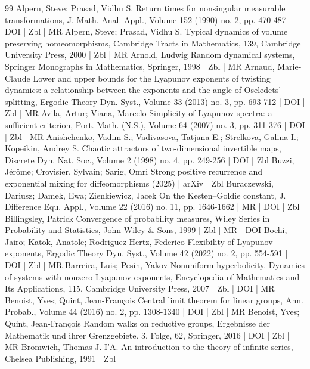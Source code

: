 \begin{thebibliography}{99}
 Alpern, Steve; Prasad, Vidhu S. Return times for nonsingular measurable transformations, J. Math. Anal. Appl., Volume 152 (1990) no. 2, pp. 470-487 | DOI | Zbl | MR
 Alpern, Steve; Prasad, Vidhu S. Typical dynamics of volume preserving homeomorphisms, Cambridge Tracts in Mathematics, 139, Cambridge University Press, 2000 | Zbl | MR
 Arnold, Ludwig Random dynamical systems, Springer Monographs in Mathematics, Springer, 1998 | Zbl | MR
 Arnaud, Marie-Claude Lower and upper bounds for the Lyapunov exponents of twisting dynamics: a relationship between the exponents and the angle of Oseledets’ splitting, Ergodic Theory Dyn. Syst., Volume 33 (2013) no. 3, pp. 693-712 | DOI | Zbl | MR
 Avila, Artur; Viana, Marcelo Simplicity of Lyapunov spectra: a sufficient criterion, Port. Math. (N.S.), Volume 64 (2007) no. 3, pp. 311-376 | DOI | Zbl | MR
 Anishchenko, Vadim S.; Vadivasova, Tatjana E.; Strelkova, Galina I.; Kopeikin, Andrey S. Chaotic attractors of two-dimensional invertible maps, Discrete Dyn. Nat. Soc., Volume 2 (1998) no. 4, pp. 249-256 | DOI | Zbl
 Buzzi, Jérôme; Crovisier, Sylvain; Sarig, Omri Strong positive recurrence and exponential mixing for diffeomorphisms (2025) | arXiv | Zbl
 Buraczewski, Dariusz; Damek, Ewa; Zienkiewicz, Jacek On the Kesten–Goldie constant, J. Difference Equ. Appl., Volume 22 (2016) no. 11, pp. 1646-1662 | MR | DOI | Zbl
 Billingsley, Patrick Convergence of probability measures, Wiley Series in Probability and Statistics, John Wiley \& Sons, 1999 | Zbl | MR | DOI
 Bochi, Jairo; Katok, Anatole; Rodriguez-Hertz, Federico Flexibility of Lyapunov exponents, Ergodic Theory Dyn. Syst., Volume 42 (2022) no. 2, pp. 554-591 | DOI | Zbl | MR
 Barreira, Luis; Pesin, Yakov Nonuniform hyperbolicity. Dynamics of systems with nonzero Lyapunov exponents, Encyclopedia of Mathematics and Its Applications, 115, Cambridge University Press, 2007 | Zbl | DOI | MR
 Benoist, Yves; Quint, Jean-François Central limit theorem for linear groups, Ann. Probab., Volume 44 (2016) no. 2, pp. 1308-1340 | DOI | Zbl | MR
 Benoist, Yves; Quint, Jean-François Random walks on reductive groups, Ergebnisse der Mathematik und ihrer Grenzgebiete. 3. Folge, 62, Springer, 2016 | DOI | Zbl | MR
 Bromwich, Thomas J. I’A. An introduction to the theory of infinite series, Chelsea Publishing, 1991 | Zbl

\end{thebibliography}
